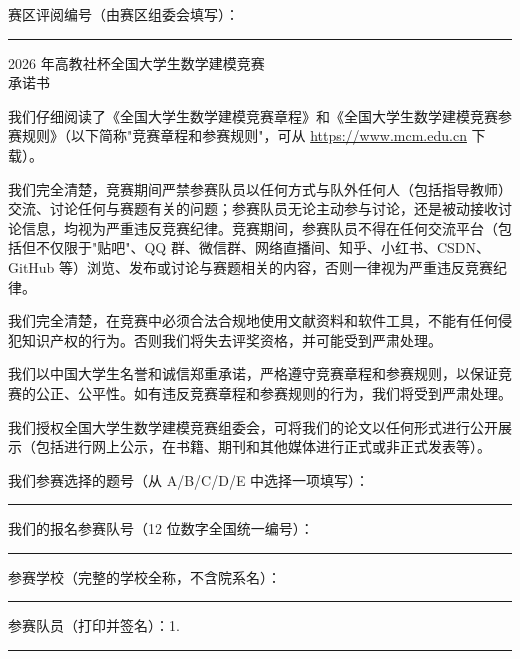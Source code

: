 \thispagestyle{empty}

\noindent 赛区评阅编号（由赛区组委会填写）：\rule{4.5cm}{0.4pt}

\vspace{0.10cm}
\begin{center}
  {\heiti{} 2026 年高教社杯全国大学生数学建模竞赛}\\[12pt]
  {\heiti{} 承\quad 诺\quad 书}
\end{center}
\vspace{0.10cm}

{\linespread{1.02}\selectfont\setlength{\parindent}{2em}

我们仔细阅读了《全国大学生数学建模竞赛章程》和《全国大学生数学建模竞赛参赛规则》（以下简称"竞赛章程和参赛规则"，可从 \url{https://www.mcm.edu.cn} 下载）。

我们完全清楚，竞赛期间严禁参赛队员以任何方式与队外任何人（包括指导教师）交流、讨论任何与赛题有关的问题；参赛队员无论主动参与讨论，还是被动接收讨论信息，均视为严重违反竞赛纪律。竞赛期间，参赛队员不得在任何交流平台（包括但不仅限于"贴吧"、QQ 群、微信群、网络直播间、知乎、小红书、CSDN、GitHub 等）浏览、发布或讨论与赛题相关的内容，否则一律视为严重违反竞赛纪律。

我们完全清楚，在竞赛中必须合法合规地使用文献资料和软件工具，不能有任何侵犯知识产权的行为。否则我们将失去评奖资格，并可能受到严肃处理。

我们以中国大学生名誉和诚信郑重承诺，严格遵守竞赛章程和参赛规则，以保证竞赛的公正、公平性。如有违反竞赛章程和参赛规则的行为，我们将受到严肃处理。

我们授权全国大学生数学建模竞赛组委会，可将我们的论文以任何形式进行公开展示（包括进行网上公示，在书籍、期刊和其他媒体进行正式或非正式发表等）。

\vspace{0.18cm}
\noindent 我们参赛选择的题号（从 A/B/C/D/E 中选择一项填写）：\rule{3.6cm}{0.4pt}

\vspace{0.10cm}
\noindent 我们的报名参赛队号（12 位数字全国统一编号）：\rule{5.2cm}{0.4pt}

\vspace{0.10cm}
\noindent 参赛学校（完整的学校全称，不含院系名）：\rule{6.6cm}{0.4pt}

\vspace{0.10cm}
\noindent 参赛队员（打印并签名）：1.\rule{6.2cm}{0.4pt}

}
